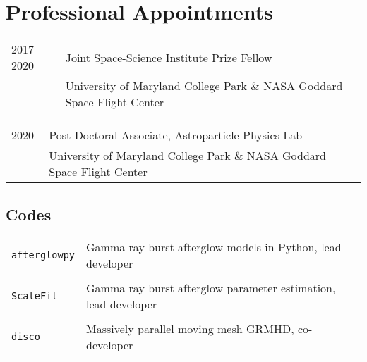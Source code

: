 \documentclass[letterpaper]{article}
\renewenvironment{itemize}{
  \begin{list}{}{
    \setlength{\leftmargin}{1.5em}
  }
}{
  \end{list}
}
\begin{document}
\section*{Professional Appointments} %
\begin{itemize}
\item \begin{tabular}{ll}
2017-2020 & Joint Space-Science Institute Prize Fellow \\
	 & University of Maryland College Park \& NASA Goddard Space Flight Center\\
\end{tabular}
\item \begin{tabular}{ll}
2020- & Post Doctoral Associate, Astroparticle Physics Lab\\
	  & University of Maryland College Park \& NASA Goddard Space Flight Center\\
\end{tabular}
\end{itemize}


\subsection*{Codes}
\begin{itemize}
\item \begin{tabular}{ll}
\texttt{afterglowpy} & Gamma ray burst afterglow models in Python, lead developer\\
& \\
\texttt{ScaleFit} & Gamma ray burst afterglow parameter estimation, lead developer\\
& \\
\texttt{disco} & Massively parallel moving mesh GRMHD, co-developer
\end{tabular}
\end{itemize}

\end{document}
